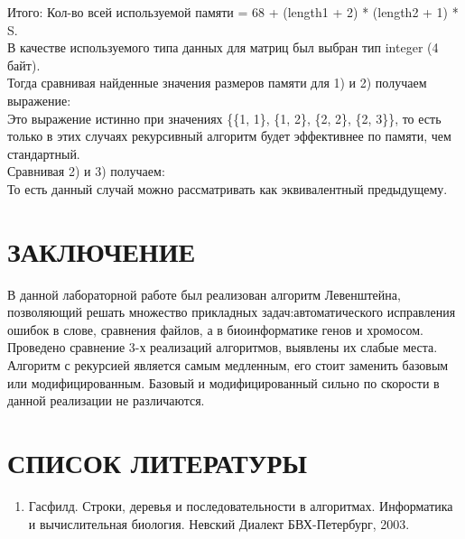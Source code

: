 \documentclass[a4paper,12pt]{article}
\begin{document}
Итого: Кол-во всей используемой памяти = 68 + (length1 + 2) * (length2 + 1) * S. \\
В качестве используемого типа данных для матриц был выбран тип integer (4 байт). \\
Тогда сравнивая найденные значения размеров памяти для 1) и 2) получаем выражение: \\
Это выражение истинно при значениях \{\{1, 1\}, \{1, 2\}, \{2, 2\}, \{2, 3\}\}, то есть только в этих случаях рекурсивный алгоритм будет эффективнее по памяти, чем стандартный. \\
Сравнивая 2) и 3) получаем: \\
То есть данный случай можно рассматривать как эквивалентный предыдущему. \\\newpage
\section{ЗАКЛЮЧЕНИЕ}

В данной лабораторной работе был реализован алгоритм Левенштейна, позволяющий решать множество прикладных задач:автоматического исправления ошибок в слове, сравнения файлов, а в биоинформатике генов и хромосом. Проведено сравнение 3-х реализаций алгоритмов, выявлены их слабые места. Алгоритм с рекурсией является самым медленным, его стоит заменить базовым или модифицированным. Базовый и модифицированный сильно по скорости в данной реализации не различаются.\newpage
\section{СПИСОК ЛИТЕРАТУРЫ}
\begin{enumerate}
\item \label{sources:source1}Гасфилд. Строки, деревья и последовательности в алгоритмах. Информатика и вычислительная биология. Невский Диалект БВХ-Петербург, 2003.
\end{enumerate}
\end{document}
